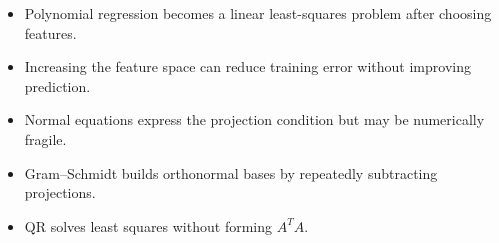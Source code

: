 \begin{itemize}
  \item Polynomial regression becomes a linear least-squares problem after
        choosing features.
  \item Increasing the feature space can reduce training error without
        improving prediction.
  \item Normal equations express the projection condition but may be
        numerically fragile.
  \item Gram--Schmidt builds orthonormal bases by repeatedly subtracting
        projections.
  \item QR solves least squares without forming $A^TA$.
\end{itemize}


